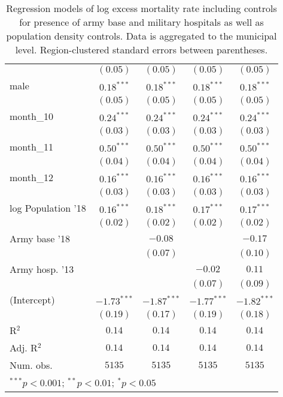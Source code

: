 \begin{table}[h!]
\begin{center}
\begin{small}
\begin{tabular}{l c c c c}
                   & $(0.05)$      & $(0.05)$      & $(0.05)$      & $(0.05)$      \\
male               & $0.18^{***}$  & $0.18^{***}$  & $0.18^{***}$  & $0.18^{***}$  \\
                   & $(0.05)$      & $(0.05)$      & $(0.05)$      & $(0.05)$      \\
month\_10          & $0.24^{***}$  & $0.24^{***}$  & $0.24^{***}$  & $0.24^{***}$  \\
                   & $(0.03)$      & $(0.03)$      & $(0.03)$      & $(0.03)$      \\
month\_11          & $0.50^{***}$  & $0.50^{***}$  & $0.50^{***}$  & $0.50^{***}$  \\
                   & $(0.04)$      & $(0.04)$      & $(0.04)$      & $(0.04)$      \\
month\_12          & $0.16^{***}$  & $0.16^{***}$  & $0.16^{***}$  & $0.16^{***}$  \\
                   & $(0.03)$      & $(0.03)$      & $(0.03)$      & $(0.03)$      \\
log Population '18 & $0.16^{***}$  & $0.18^{***}$  & $0.17^{***}$  & $0.17^{***}$  \\
                   & $(0.02)$      & $(0.02)$      & $(0.02)$      & $(0.02)$      \\
Army base '18      &               & $-0.08$       &               & $-0.17$       \\
                   &               & $(0.07)$      &               & $(0.10)$      \\
Army hosp. '13     &               &               & $-0.02$       & $0.11$        \\
                   &               &               & $(0.07)$      & $(0.09)$      \\
(Intercept)        & $-1.73^{***}$ & $-1.87^{***}$ & $-1.77^{***}$ & $-1.82^{***}$ \\
                   & $(0.19)$      & $(0.17)$      & $(0.19)$      & $(0.18)$      \\
\hline
R$^2$              & $0.14$        & $0.14$        & $0.14$        & $0.14$        \\
Adj. R$^2$         & $0.14$        & $0.14$        & $0.14$        & $0.14$        \\
Num. obs.          & $5135$        & $5135$        & $5135$        & $5135$        \\
\hline
\multicolumn{5}{l}{\tiny{$^{***}p<0.001$; $^{**}p<0.01$; $^{*}p<0.05$}}
\end{tabular}
\end{small}
\caption{Regression models of log excess mortality rate including controls for presence of army base and military hospitals as well as population density controls. Data is aggregated to the municipal level. Region-clustered standard errors between parentheses.}
\label{tab:armymodels}
\end{center}
\end{table}
